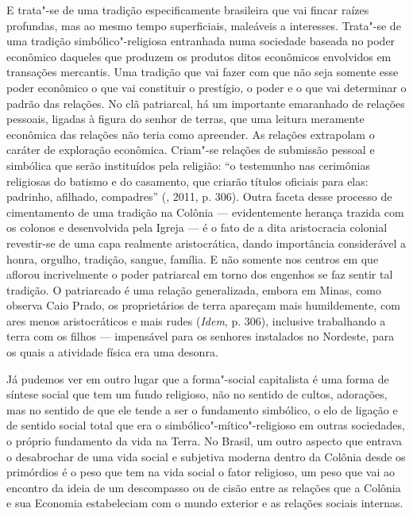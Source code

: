 E trata"-se de uma tradição especificamente brasileira que vai fincar
raízes profundas, mas ao mesmo tempo superficiais, maleáveis a
interesses. Trata"-se de uma tradição simbólico"-religiosa entranhada numa
sociedade baseada no poder econômico daqueles que produzem os produtos
ditos econômicos envolvidos em transações mercantis. Uma tradição que
vai fazer com que não seja somente esse poder econômico o que vai
constituir o prestígio, o poder e o que vai determinar o padrão das
relações. No clã patriarcal, há um importante emaranhado de relações
pessoais, ligadas à figura do senhor de terras, que uma leitura
meramente econômica das relações não teria como apreender. As relações
extrapolam o caráter de exploração econômica. Criam"-se relações de
submissão pessoal e simbólica que serão instituídos pela religião: ``o
testemunho nas cerimônias religiosas do batismo e do casamento, que
criarão títulos oficiais para elas: padrinho, afilhado, compadres''
(, 2011, p. 306). Outra faceta desse processo de cimentamento de
uma tradição na Colônia --- evidentemente herança trazida com os colonos
e desenvolvida pela Igreja --- é o fato de a dita aristocracia colonial
revestir-se de uma capa realmente aristocrática, dando importância considerável a
honra, orgulho, tradição, sangue, família. E não somente nos centros em
que aflorou incrivelmente o poder patriarcal em torno dos engenhos se
faz sentir tal tradição. O patriarcado é uma relação generalizada,
embora em Minas, como observa Caio Prado, os proprietários de terra
apareçam mais humildemente, com ares menos aristocráticos e mais rudes
(\emph{Idem}, p. 306), inclusive trabalhando a terra com os filhos ---
impensável para os senhores instalados no Nordeste, para os quais a
atividade física era uma desonra.

Já pudemos ver em outro lugar que a forma"-social capitalista é uma
forma de síntese social que tem um fundo religioso, não no sentido de
cultos, adorações, mas no sentido de que ele tende a ser o fundamento
simbólico, o elo de ligação e de sentido social total que era o
simbólico"-mítico"-religioso em outras sociedades, o próprio fundamento da
vida na Terra. No Brasil, um outro aspecto que entrava o desabrochar de
uma vida social e subjetiva moderna dentro da Colônia desde os primórdios
é o peso que tem na vida social o fator religioso, um peso que vai ao
encontro da ideia de um descompasso ou de cisão entre as relações que
a Colônia e sua Economia estabeleciam com o mundo exterior e as relações
sociais internas.

